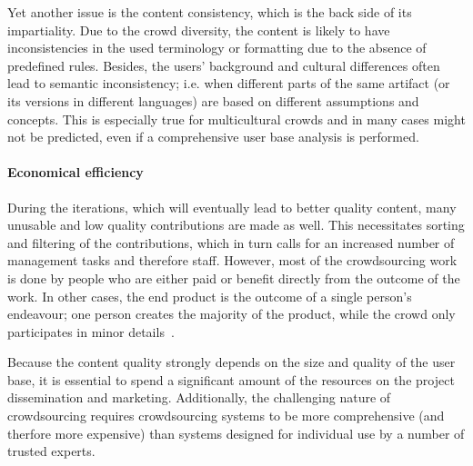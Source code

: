 \documentclass[ngerman,UKenglish,table]{scrbook}
\begin{document}
Yet another issue is the content consistency, which is the back side of its impartiality. 
Due to the crowd diversity, the content is likely to have inconsistencies in the used terminology or formatting due to the absence of predefined rules.
Besides, the users' background and cultural differences often lead to semantic inconsistency; i.e. when different parts of the same artifact (or its versions in different languages) are based on different assumptions and concepts.  
This is especially true for multicultural crowds and in many cases might not be predicted, even if a comprehensive user base analysis is performed. 
  

%
%
%


\paragraph{Economical efficiency}

During the iterations, which will eventually lead to better quality content, many unusable and low quality contributions are made as well.
This necessitates sorting and filtering of the contributions, which in turn calls for an increased number of management tasks and therefore staff. 
However, most of the crowdsourcing work is done by people who are either paid or benefit directly from the outcome of the work.
In other cases, the end product is the outcome of a single person's endeavour; one person creates the majority of the product, while the crowd only participates in minor details~\cite{woods2009myth}.

Because the content quality strongly depends on the size and quality of the user base, it is essential to spend a significant amount of the resources on the project dissemination and marketing. 
Additionally, the challenging nature of crowdsourcing requires crowdsourcing systems to be more comprehensive (and therfore more expensive) than systems designed for individual use by a number of trusted experts.
\end{document}
